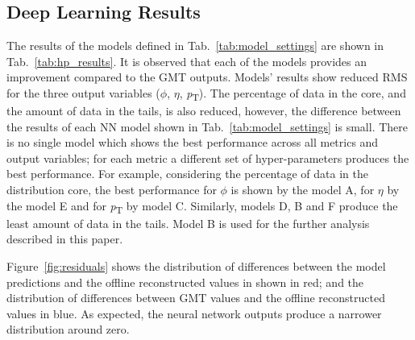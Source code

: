 \documentclass[10pt, paper=a4, UKenglish]{article}
\begin{document}
\subsection{Deep Learning Results}

The results of the models defined in Tab.~\ref{tab:model_settings} are shown in Tab.~\ref{tab:hp_results}. It is observed that each of the models provides an improvement compared to the GMT outputs. Models' results show reduced RMS for the three output variables ($\phi$, $\eta$, \textit{p}\textsubscript{T}). The percentage of data in the core, and the amount of data in the tails, is also reduced, however, the difference between the results of each NN model shown in Tab.~\ref{tab:model_settings} is small. There is no single model which shows the best performance across all metrics and output variables; for each metric a different set of hyper-parameters produces the best performance. For example, considering the percentage of data in the distribution core, the best performance for $\phi$ is shown by the model A, for $\eta$ by the model E and for \textit{p}\textsubscript{T} by model C. Similarly, models D, B and F produce the least amount of data in the tails. Model B is used for the further analysis described in this paper.

Figure~\ref{fig:residuals} shows the distribution of differences between the model predictions and the offline reconstructed values in shown in red; and the distribution of differences between GMT values and the offline reconstructed values in blue. As expected, the neural network outputs produce a narrower distribution around zero.
 
\end{document}
